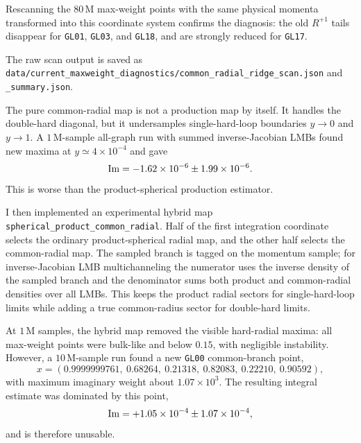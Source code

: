 \documentclass[11pt]{article}
\begin{document}
Rescanning the \(80\,\mathrm{M}\) max-weight points with the same physical
momenta transformed into this coordinate system confirms the diagnosis: the
old \(R^{+1}\) tails disappear for \texttt{GL01}, \texttt{GL03}, and
\texttt{GL18}, and are strongly reduced for \texttt{GL17}.
\begin{center}
\scriptsize
{}
\end{center}
The raw scan output is saved as
\texttt{data/current\_maxweight\_diagnostics/common\_radial\_ridge\_scan.json}
and \texttt{\_summary.json}.

The pure common-radial map is not a production map by itself.  It handles the
double-hard diagonal, but it undersamples single-hard-loop boundaries
\(y\to0\) and \(y\to1\).  A \(1\,\mathrm{M}\)-sample all-graph run with
summed inverse-Jacobian LMBs found new maxima at \(y\simeq4\times10^{-4}\) and
gave
\[
  {\rm Im}=-1.62\times10^{-6}\pm1.99\times10^{-6}.
\]
This is worse than the product-spherical production estimator.

I then implemented an experimental hybrid map
\texttt{spherical\_product\_common\_radial}.  Half of the first integration
coordinate selects the ordinary product-spherical radial map, and the other
half selects the common-radial map.  The sampled branch is tagged on the
momentum sample; for inverse-Jacobian LMB multichanneling the numerator uses
the inverse density of the sampled branch and the denominator sums both
product and common-radial densities over all LMBs.  This keeps the product
radial sectors for single-hard-loop limits while adding a true common-radius
sector for double-hard limits.

At \(1\,\mathrm{M}\) samples, the hybrid map removed the visible hard-radial
maxima: all max-weight points were bulk-like and below \(0.15\), with
negligible instability.  However, a \(10\,\mathrm{M}\)-sample run found a new
\texttt{GL00} common-branch point,
\[
  x=(0.9999999761,\ 0.68264,\ 0.21318,\ 0.82083,\ 0.22210,\ 0.90592),
\]
with maximum imaginary weight about \(1.07\times10^3\).  The resulting
integral estimate was dominated by this point,
\[
  {\rm Im}=+1.05\times10^{-4}\pm1.07\times10^{-4},
\]
and is therefore unusable.
\end{document}
